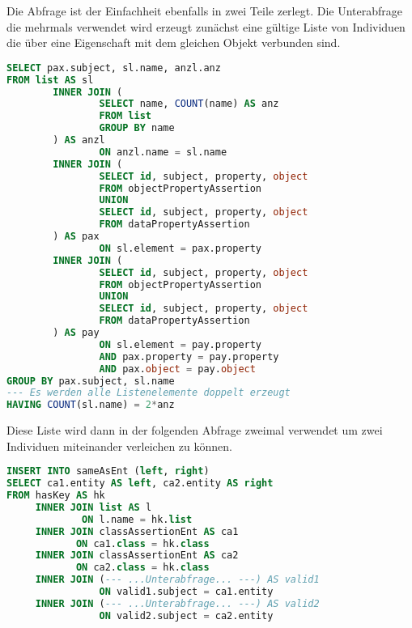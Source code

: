 Die Abfrage ist der Einfachheit ebenfalls in zwei Teile zerlegt. Die Unterabfrage die mehrmals verwendet wird erzeugt zunächst eine gültige Liste von Individuen die über eine Eigenschaft mit dem gleichen Objekt verbunden sind.
\begin{lstlisting}[language=SQL]
SELECT pax.subject, sl.name, anzl.anz
FROM list AS sl
        INNER JOIN (
                SELECT name, COUNT(name) AS anz
                FROM list
                GROUP BY name
        ) AS anzl
                ON anzl.name = sl.name
        INNER JOIN (
                SELECT id, subject, property, object
                FROM objectPropertyAssertion
                UNION
                SELECT id, subject, property, object
                FROM dataPropertyAssertion
        ) AS pax
                ON sl.element = pax.property
        INNER JOIN (
                SELECT id, subject, property, object
                FROM objectPropertyAssertion
                UNION
                SELECT id, subject, property, object
                FROM dataPropertyAssertion
        ) AS pay
                ON sl.element = pay.property
                AND pax.property = pay.property
                AND pax.object = pay.object
GROUP BY pax.subject, sl.name
--- Es werden alle Listenelemente doppelt erzeugt
HAVING COUNT(sl.name) = 2*anz
\end{lstlisting}

Diese Liste wird dann in der folgenden Abfrage zweimal verwendet um zwei Individuen miteinander verleichen zu können.
\begin{lstlisting}[language=SQL]
INSERT INTO sameAsEnt (left, right)
SELECT ca1.entity AS left, ca2.entity AS right
FROM hasKey AS hk
     INNER JOIN list AS l
             ON l.name = hk.list
     INNER JOIN classAssertionEnt AS ca1
            ON ca1.class = hk.class
     INNER JOIN classAssertionEnt AS ca2
            ON ca2.class = hk.class
     INNER JOIN (--- ...Unterabfrage... ---) AS valid1
                ON valid1.subject = ca1.entity
     INNER JOIN (--- ...Unterabfrage... ---) AS valid2
                ON valid2.subject = ca2.entity
\end{lstlisting}